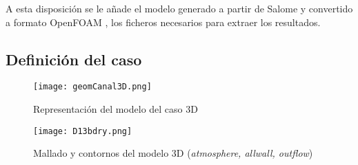 A esta disposición se le añade el modelo generado a partir de Salome y convertido a
formato OpenFOAM \cite{conversion}, los ficheros necesarios para
extraer los resultados.

\subsection{Definición del caso}\label{header-n18}

\begin{figure}[b]
\centering
\texttt{[image: geomCanal3D.png]}
\caption{Representación del modelo del caso 3D}
\label{fig:geomCanal3D}
\end{figure}

\begin{figure}[b]
\centering
\texttt{[image: D13bdry.png]}
\caption{Mallado y contornos del modelo 3D (\emph{atmosphere, allwall, outflow})}
\label{fig:D13bdry}
\end{figure}

